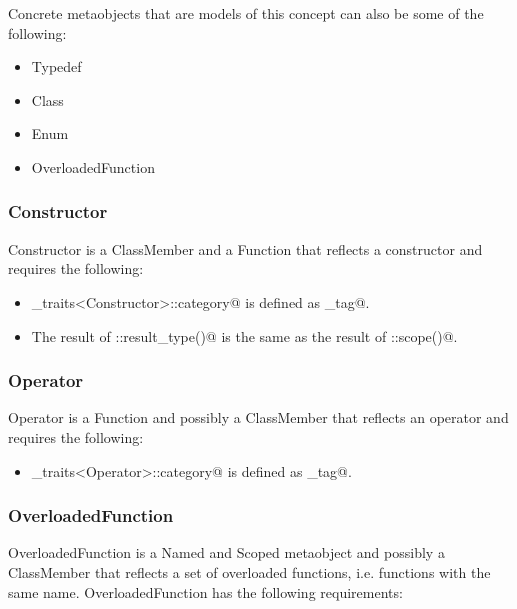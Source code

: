 Concrete metaobjects that are models of this concept can also be some of the following:
\begin{itemize}
	\item{\metaobject Typedef}
	\item{\metaobject Class}
	\item{\metaobject Enum}
	\item{\metaobject OverloadedFunction}
\end{itemize}

\subsubsection{Constructor}

{\metaobject Constructor} is a {\metaobject ClassMember} and a {\metaobject Function} that
reflects a constructor and requires the following:

\begin{itemize}
	\item \verb@metaobject_traits<Constructor>::category@ is defined as  \verb@constructor_tag@.

	\item The result of \verb@Constructor::result_type()@ is the same as the result of
	\verb@Constructor::scope()@.
\end{itemize}

\subsubsection{Operator}

{\metaobject Operator} is a {\metaobject Function} and possibly a {\metaobject ClassMember}
that reflects an operator and requires the following:

\begin{itemize}
	\item \verb@metaobject_traits<Operator>::category@ is defined as  \verb@operator_tag@.
\end{itemize}

\subsubsection{OverloadedFunction}

{\metaobject OverloadedFunction} is a {\metaobject Named} and {\metaobject Scoped} metaobject
and possibly a {\metaobject ClassMember}
that reflects a set of overloaded functions, i.e. functions with the same name.
{\metaobject OverloadedFunction} has the following requirements:

